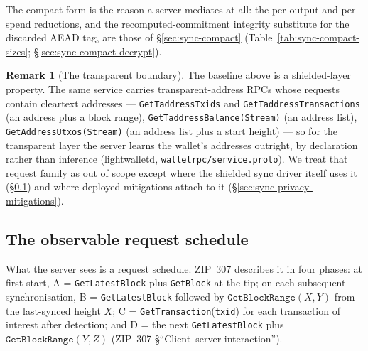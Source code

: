 \documentclass[11pt,a4paper]{article}
\theoremstyle{definition}
\newtheorem{remark}[theorem]{Remark}
\begin{document}
The compact form is the reason a server mediates at all: the per-output
and per-spend reductions, and the recomputed-commitment integrity
substitute for the discarded AEAD tag, are those of
\S\ref{sec:sync-compact} (Table~\ref{tab:sync-compact-sizes};
\S\ref{sec:sync-compact-decrypt}).

\begin{remark}[The transparent boundary]\label{rem:sync-transparent}
The baseline above is a shielded-layer property. The same service carries
transparent-address RPCs whose requests contain cleartext addresses ---
\texttt{GetTaddressTxids} and \texttt{GetTaddressTransactions} (an address
plus a block range), \texttt{GetTaddressBalance(Stream)} (an address list),
\texttt{GetAddressUtxos(Stream)} (an address list plus a start height) ---
so for the transparent layer the server learns the wallet's addresses
outright, by declaration rather than inference (\textsf{lightwalletd},
\texttt{walletrpc/service.proto}). We treat that
request family as out of scope except where the shielded sync driver itself
uses it (\S\ref{sec:sync-privacy-schedule}) and where deployed mitigations
attach to it (\S\ref{sec:sync-privacy-mitigations}).
\end{remark}

\subsection{The observable request schedule}\label{sec:sync-privacy-schedule}

What the server sees is a request schedule. ZIP~307 describes it in four
phases: at first start, \textsf{A} = \texttt{GetLatestBlock} plus
\texttt{GetBlock} at the tip; on each subsequent synchronisation,
\textsf{B} = \texttt{GetLatestBlock} followed by
$\texttt{GetBlockRange}(X, Y)$ from the last-synced height $X$;
\textsf{C} = \texttt{GetTransaction}(\texttt{txid}) for each transaction of
interest after detection; and \textsf{D} = the next
\texttt{GetLatestBlock} plus $\texttt{GetBlockRange}(Y, Z)$
(ZIP~307 \S``Client--server interaction'').
\end{document}
